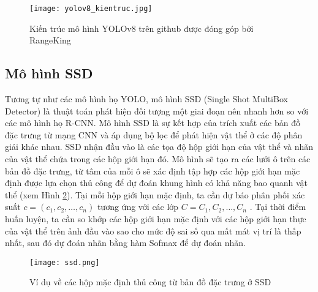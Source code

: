 \documentclass[../the.tex]{subfiles}
\begin{document}
\begin{figure}[H]
	\centering
	\texttt{[image: yolov8\_kientruc.jpg]}
	\caption{Kiến trúc mô hình YOLOv8 trên github được đóng góp bởi RangeKing}
	\label{fig:yolo8_kientruc}
\end{figure}


\subsection{Mô hình SSD}
\label{sec:ssd}
{\fontsize{13}{12} \selectfont

	Tương tự như các mô hình họ YOLO, mô hình SSD \cite{Liu_2016} (Single Shot MultiBox Detector) là thuật toán phát hiện đối tượng một giai đoạn nên nhanh hơn so với các mô hình họ R-CNN.
	Mô hình SSD là sự kết hợp của trích xuất các bản đồ đặc trưng từ mạng CNN và áp dụng bộ lọc để phát hiện vật thể ở các độ phân giải khác nhau. SSD nhận đầu vào là các tọa độ hộp giới hạn của vật thể và nhãn của vật thể chứa trong các hộp giới hạn đó.
	Mô hình sẽ tạo ra các lưới ô trên các bản đồ đặc trưng, từ tâm của mỗi ô sẽ xác định tập hợp các hộp giới hạn mặc định được lựa chọn thủ công để dự đoán khung hình có khả năng bao quanh vật thể (xem Hình \ref{fig:ssd}).
	Tại mỗi hộp giới hạn mặc định, ta cần dự báo phân phối xác suất $c = (c_1, c_2,\dots, c_n)$ tương ứng với các lớp $C= C_1, C_2,\dots,C_n $ . Tại thời điểm huấn luyện, ta cần so khớp các hộp giới hạn mặc định với các hộp giới hạn thực của vật thể trên ảnh đầu vào sao cho mức độ sai số qua mất mát vị trí là thấp nhất, sau đó dự đoán nhãn bằng hàm Sofmax để dự đoán nhãn.

}

\begin{figure}[H]
	\centering
	\texttt{[image: ssd.png]}
	\caption{Ví dụ về các hộp mặc định thủ công từ bản đồ đặc trưng ở SSD \cite{Liu_2016}}
	\label{fig:ssd}
\end{figure}
\end{document}
